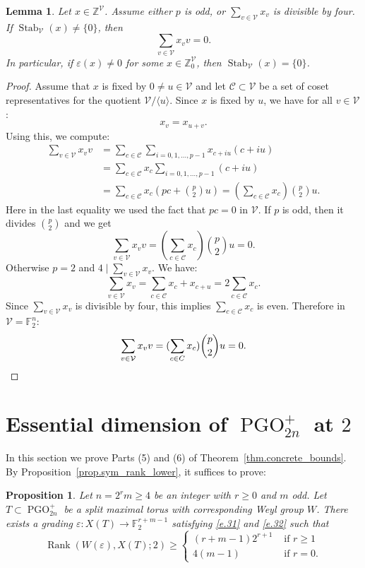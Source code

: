 \documentclass[12pt]{amsart}
\numberwithin{equation}{section}
\newtheorem{lemma}[theorem]{Lemma}
\newtheorem{proposition}[theorem]{Proposition}
\theoremstyle{definition}
\newcommand{\cC}{\mathcal{C}}
\newcommand{\cV}{\mathcal{V}}
\newcommand{\bF}{\mathbb{F}}
\newcommand{\bZ}{\mathbb{Z}}
\newcommand{\PGO}{\operatorname{PGO}}
\newcommand{\SymRank}{\operatorname{Rank}}
\newcommand{\Stab}{\operatorname{Stab}}
\newcommand{\eps}{\varepsilon}
\begin{document}
    \begin{lemma}\label{lem.PGLn_element}
        Let $x\in\bZ^\cV$. Assume either $p$ is odd, or $\sum_{v\in \cV} x_v$ is divisible by four. If $\Stab_{\cV}(x) \neq \{0\}$, then
        $$\sum_{v\in \cV} x_v v = 0.$$
        In particular, if $\eps(x)\neq 0$ for some $x\in \bZ^\cV_0$, then $\Stab_{\cV}(x) = \{0\}$.
    \end{lemma}
    \begin{proof}
        Assume that $x$ is fixed by $0\neq u\in \cV$ and let $\cC \subset \cV$ be a set of coset representatives for the quotient $\cV/\langle u\rangle$. Since $x$ is fixed by $u$, we have for all $v\in \cV$:
$$x_{v} = x_{u+v}.$$
Using this, we compute:
 \begin{align*}
     \sum_{v\in \cV} x_v v  &=\sum_{c\in \cC} \sum_{i= 0, 1,\dots,p-1} x_{c + iu} (c+iu)\\
            &= \sum_{c\in \cC} x_{c} \sum_{i= 0, 1,\dots,p-1}  (c+iu)\\
            &= \sum_{c\in \cC} x_{c} (pc+\binom{p}{2} u) = (\sum_{c\in \cC} x_{c})\binom{p}{2}u.
 \end{align*}  
Here in the last equality we used the fact that $pc = 0$ in $\cV$. If $p$ is odd, then it divides $\binom{p}{2}$ and we get
$$\sum_{v\in \cV} x_v v =(\sum_{c\in \cC} x_{c})\binom{p}{2}u = 0. $$
Otherwise $p=2$ and $4\mid \sum_{v\in \cV} x_v$. We have:
$$\sum_{v\in \cV} x_v = \sum_{c\in \cC}  x_{c} + x_{c+u} = 2\sum_{c\in \cC} x_{c}.$$
Since $\sum_{v\in \cV} x_v $ is divisible by four, this implies $\sum_{c\in \cC} x_{c}$ is even.
Therefore in $\cV = \bF_2^{n}$:
\[\sum_{v\in \cV} x_v v = (\sum_{c\in C} x_{c})\binom{p}{2}u = 0.\qedhere\]
    \end{proof}




\section{Essential dimension of \texorpdfstring{$\PGO^{+}_{2n}$}{PGO} at \texorpdfstring{$2$}{2}}

  In this section we prove Parts (5) and (6) of Theorem~\ref{thm.concrete_bounds}.  By Proposition~\ref{prop.sym_rank_lower}, it suffices to prove:
\begin{proposition}\label{prop.rank_Dn}
Let $n =2^r m \geq 4$ be an integer with $r\geq 0$ and $m$ odd. Let $T\subset \PGO^{+}_{2n}$ be a split maximal torus with corresponding Weyl group $W$. There exists a grading $\eps:X(T) \to \bF_2^{r+m-1}$ satisfying \eqref{e.31} and \eqref{e.32} such that
    \begin{equation}\label{e.symrankD_n}
    \SymRank(W(\eps),X(T);2) \geq \begin{cases}
        (r+m-1)2^{r+1} & \text{ if } r\geq 1 \\
        4(m-1) & \text{ if } r=0.
    \end{cases}
\end{equation}
\end{proposition}
\end{document}
